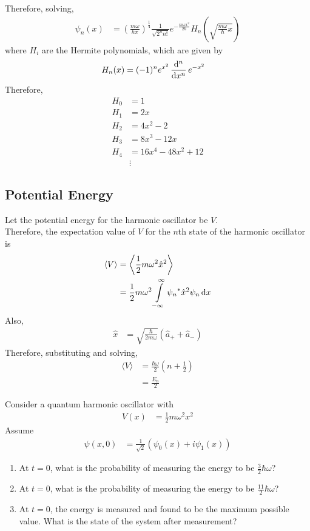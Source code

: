 \documentclass[titlepage, fleqn, a4paper, 12pt, twoside]{article}
\theoremstyle{definition}
\theoremstyle{theorem}
\let\Oldsubsection\subsection
\renewcommand{\subsection}{\FloatBarrier\Oldsubsection}
\begin{document}
Therefore, solving,
\begin{align*}
	\psi_n(x) &= \left( \frac{m \omega}{h \pi} \right)^{\frac{1}{4}} \frac{1}{\sqrt{2^n n!}} e^{-\frac{m \omega x^2}{2 \hbar}} H_n \left( \sqrt{\frac{m \omega}{\hbar} x} \right)
\end{align*}
where $H_i$ are the Hermite polynomials, which are given by
\begin{align*}
	H_n(x) &= (-1)^n e^{x^2} \dod[n]{}{x} e^{-x^2}
\end{align*}
Therefore,
\begin{align*}
	H_0 &= 1\\
	H_1 &= 2 x\\
	H_2 &= 4 x^2 - 2\\
	H_3 &= 8 x^3 - 12 x\\
	H_4 &= 16 x^4 - 48 x^2 + 12\\
	&\vdots
\end{align*}

\subsection{Potential Energy}

Let the potential energy for the harmonic oscillator be $V$.\\
Therefore, the expectation value of $V$ for the $n$th state of the harmonic oscillator is
\begin{align*}
	\langle V \rangle &= \left\langle \frac{1}{2} m \omega^2 \hat{x}^2 \right\rangle\\
	&= \frac{1}{2} m \omega^2 \int\limits_{-\infty}^{\infty} {\psi_n}^* \hat{x}^2 \psi_n \dif x
\end{align*}
Also,
\begin{align*}
	\hat{x} &= \sqrt{\frac{\hbar}{2 m \omega}} \left( \hat{a}_+ + \hat{a}_- \right)
\end{align*}
Therefore, substituting and solving,
\begin{align*}
	\langle V \rangle &= \frac{\hbar \omega}{2} \left( n + \frac{1}{2} \right)\\
	&= \frac{E_n}{2}
\end{align*}

\begin{question}
	Consider a quantum harmonic oscillator with
	\begin{align*}
		V(x) &= \frac{1}{2} m \omega^2 x^2
	\end{align*}
	Assume
	\begin{align*}
		\psi(x,0) &= \frac{1}{\sqrt{2}} \left( \psi_0(x) + i \psi_1(x) \right)
	\end{align*}
	\begin{enumerate}
		\item
			At $t = 0$, what is the probability of measuring the energy to be $\frac{3}{2} \hbar \omega$?
		\item
			At $t = 0$, what is the probability of measuring the energy to be $\frac{11}{2} \hbar \omega$?
		\item
			At $t = 0$, the energy is measured and found to be the maximum possible value.
			What is the state of the system after measurement?
	\end{enumerate}
\end{question}
\end{document}
